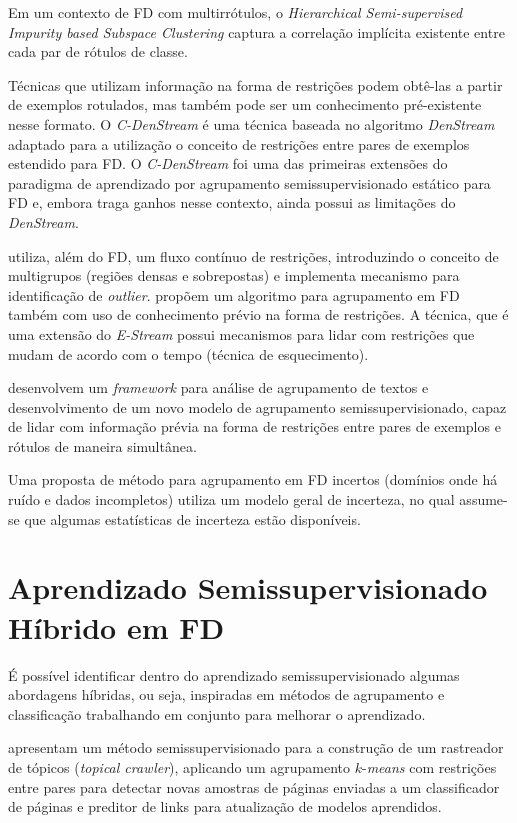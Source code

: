 Em um contexto de FD com multirrótulos, o \emph{Hierarchical Semi-supervised Impurity based Subspace Clustering} \cite{Ahmed2010} captura a correlação implícita existente entre cada par de rótulos de classe.

Técnicas que utilizam informação na forma de restrições podem obtê-las a partir de exemplos rotulados, mas também pode ser um conhecimento pré-existente nesse formato. O \emph{C-DenStream} \cite{Ruiz2009} é uma técnica baseada no algoritmo \emph{DenStream} adaptado para a utilização o conceito de restrições entre pares de exemplos estendido para FD. O \emph{C-DenStream} foi uma das primeiras extensões do paradigma de aprendizado por agrupamento semissupervisionado estático para FD e, embora traga ganhos nesse contexto, ainda possui as limitações do \emph{DenStream}. 

 utiliza, além do FD, um fluxo contínuo de restrições, introduzindo o conceito de multigrupos (regiões densas e sobrepostas) e implementa mecanismo para identificação de \emph{outlier}.  \label{chRevisao:Sirampuj2013} propõem um algoritmo para agrupamento em FD também com uso de conhecimento prévio na forma de restrições. A técnica, que é uma extensão do \emph{E-Stream} \cite{Udommanetanakit2007} possui mecanismos para lidar com restrições que mudam de acordo com o tempo (técnica de esquecimento).

 desenvolvem um \emph{framework} para análise de agrupamento de textos e desenvolvimento de um novo modelo de agrupamento semissupervisionado, capaz de lidar com informação prévia na forma de restrições entre pares de exemplos e rótulos de maneira simultânea.

Uma proposta de método para agrupamento em FD incertos (domínios onde há ruído e dados incompletos) \cite{Aggarwal2008} utiliza um modelo geral de incerteza, no qual assume-se que algumas estatísticas de incerteza estão disponíveis. 

\section{Aprendizado Semissupervisionado Híbrido em FD}

É possível identificar dentro do aprendizado semissupervisionado algumas abordagens híbridas, ou seja, inspiradas em métodos de agrupamento e classificação trabalhando em conjunto para melhorar o aprendizado.

 apresentam um método semissupervisionado para a construção de um rastreador de tópicos (\emph{topical crawler}), aplicando um agrupamento $k$-\emph{means} com restrições entre pares para detectar novas amostras de páginas enviadas a um classificador de páginas e preditor de links para atualização de modelos aprendidos.

